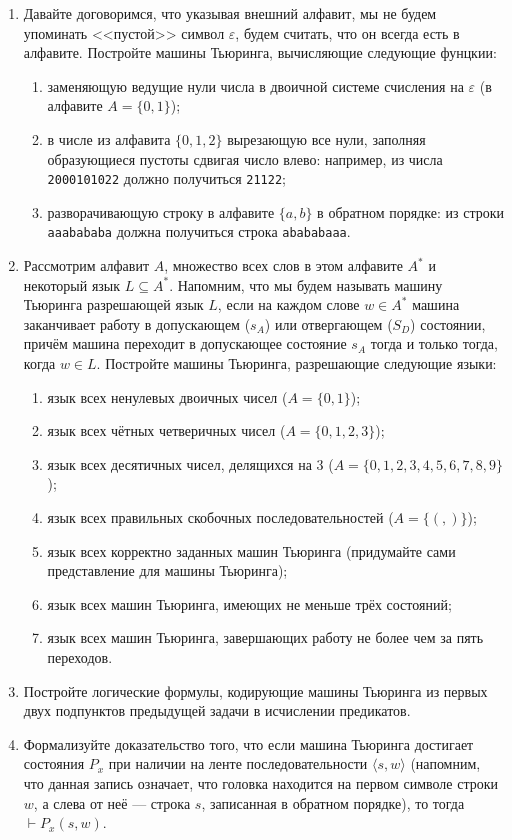 \documentclass[10pt,a4paper,oneside]{article}
\begin{document}
\begin{enumerate}
\item Давайте договоримся, что указывая внешний алфавит, мы не будем упоминать 
<<пустой>> символ $\varepsilon$, будем считать, что он всегда есть в алфавите.
Постройте машины Тьюринга, вычисляющие следующие фунцкии:

\begin{enumerate}
\item заменяющую ведущие нули числа в двоичной системе счисления на $\varepsilon$ 
(в алфавите $A = \{0,1\}$);
\item в числе из алфавита $\{0,1,2\}$ вырезающую все нули, заполняя образующиеся пустоты 
сдвигая число влево: например, из числа \verb!2000101022! должно получиться \verb!21122!;
\item разворачивающую строку в алфавите $\{a,b\}$ в обратном порядке:
из строки \verb!aaabababa! должна получиться строка \verb!abababaaa!.
\end{enumerate}

\item Рассмотрим алфавит $A$, множество всех слов в этом алфавите $A^*$ и некоторый
язык $L \subseteq A^*$. Напомним, что мы будем называть машину Тьюринга разрешающей язык $L$,
если на каждом слове $w \in A^*$ машина заканчивает работу в допускающем ($s_A$) или 
отвергающем ($S_D$) состоянии, причём машина переходит в допускающее состояние $s_A$ тогда 
и только тогда, когда $w \in L$.
Постройте машины Тьюринга, разрешающие следующие языки:

\begin{enumerate}
\item язык всех ненулевых двоичных чисел ($A = \{0,1\}$);
\item язык всех чётных четверичных чисел ($A = \{0,1,2,3\}$);
\item язык всех десятичных чисел, делящихся на 3 ($A = \{0,1,2,3,4,5,6,7,8,9\}$);
\item язык всех правильных скобочных последовательностей ($A = \{(,)\}$);
\item язык всех корректно заданных машин Тьюринга (придумайте сами представление
для машины Тьюринга);
\item язык всех машин Тьюринга, имеющих не меньше трёх состояний;
\item язык всех машин Тьюринга, завершающих работу не более чем за пять переходов.
\end{enumerate}

\item Постройте логические формулы, кодирующие машины Тьюринга
из первых двух подпунктов предыдущей задачи в исчислении предикатов.

\item Формализуйте доказательство того, что если машина Тьюринга достигает
состояния $P_x$ при наличии на ленте последовательности $\langle s, w \rangle$
(напомним, что данная запись означает, что головка находится на первом 
символе строки $w$, а слева от неё --- строка $s$, записанная в обратном
порядке), то тогда $\vdash P_x(s,w)$.

\end{enumerate}
\end{document}

